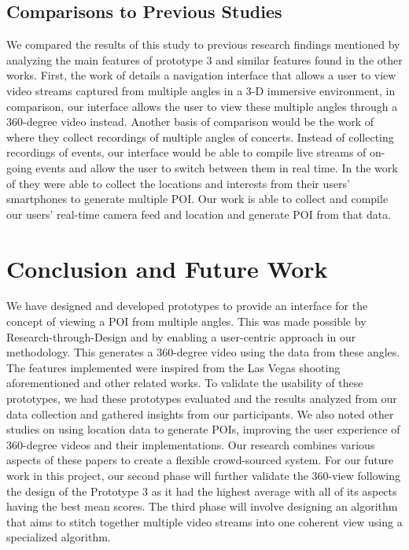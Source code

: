 \documentclass{sigchi}
\begin{document}

 

\subsection{Comparisons to Previous Studies}
We compared the results of this study to previous research findings mentioned by analyzing the main features of prototype 3 and similar features found in the other works. First, the work of \cite{zhou2011system} details a navigation interface that allows a user to view video streams captured from multiple angles in a 3-D immersive environment, in comparison, our interface allows the user to view these multiple angles through a 360-degree video instead. Another basis of comparison would be the work of \cite{shrestha2010automatic} where they collect recordings of multiple angles of concerts. Instead of collecting recordings of events, our interface would be able to compile live streams of on-going events and allow the user to switch between them in real time. In the work of \cite{molegi2018regions} they were able to collect the locations and interests from their users' smartphones to generate multiple POI. Our work is able to collect and compile our users' real-time camera feed and location and generate POI from that data.


\section{Conclusion and Future Work}
We have designed and developed prototypes to provide an interface for the concept of viewing a POI from multiple angles. This was made possible by Research-through-Design and by enabling a user-centric approach in our methodology.  This generates a 360-degree video using the data from these angles. The features implemented were inspired from the Las Vegas shooting aforementioned and other related works. To validate the usability of these prototypes, we had these prototypes evaluated and the results analyzed from our data collection and gathered insights from our participants. We also noted other studies on using location data to generate POIs, improving the user experience of 360-degree videos and their implementations. Our research combines various aspects of these papers to create a flexible crowd-sourced system. For our future work in this project, our second phase will further validate the 360-view following the design of the Prototype 3 as it had the highest average with all of its aspects having the best mean scores. The third phase will involve designing an algorithm that aims to stitch together multiple video streams into one coherent view using a specialized algorithm.
\end{document}
